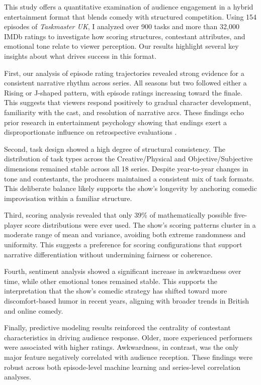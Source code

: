 \documentclass[10pt,letterpaper]{article}
\begin{document}
This study offers a quantitative examination of audience engagement in a hybrid entertainment format that blends comedy with structured competition. Using 154 episodes of \textit{Taskmaster UK}, I analyzed over 900 tasks and more than 32,000 IMDb ratings to investigate how scoring structures, contestant attributes, and emotional tone relate to viewer perception. Our results highlight several key insights about what drives success in this format.

First, our analysis of episode rating trajectories revealed strong evidence for a consistent narrative rhythm across series. All seasons but two followed either a Rising or J-shaped pattern, with episode ratings increasing toward the finale. This suggests that viewers respond positively to gradual character development, familiarity with the cast, and resolution of narrative arcs. These findings echo prior research in entertainment psychology showing that endings exert a disproportionate influence on retrospective evaluations \cite{fredrickson1993peakend, rozin2004temporal}.

Second, task design showed a high degree of structural consistency. The distribution of task types across the Creative/Physical and Objective/Subjective dimensions remained stable across all 18 series. Despite year-to-year changes in tone and contestants, the producers maintained a consistent mix of task formats. This deliberate balance likely supports the show’s longevity by anchoring comedic improvisation within a familiar structure.

Third, scoring analysis revealed that only 39\% of mathematically possible five-player score distributions were ever used. The show's scoring patterns cluster in a moderate range of mean and variance, avoiding both extreme randomness and uniformity. This suggests a preference for scoring configurations that support narrative differentiation without undermining fairness or coherence.

Fourth, sentiment analysis showed a significant increase in awkwardness over time, while other emotional tones remained stable. This supports the interpretation that the show's comedic strategy has shifted toward more discomfort-based humor in recent years, aligning with broader trends in British and online comedy.

Finally, predictive modeling results reinforced the centrality of contestant characteristics in driving audience response. Older, more experienced performers were associated with higher ratings. Awkwardness, in contrast, was the only major feature negatively correlated with audience reception. These findings were robust across both episode-level machine learning and series-level correlation analyses.
\end{document}
